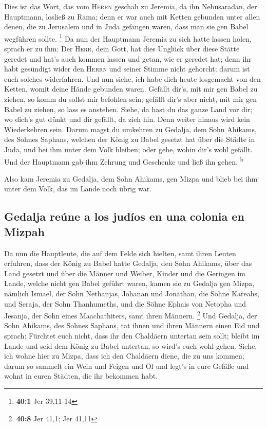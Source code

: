  Dies ist das Wort, das vom \textsc{Herrn} geschah zu
Jeremia, da ihn Nebusaradan, der Hauptmann, losließ zu Rama; denn er war
auch mit Ketten gebunden unter allen denen, die zu Jerusalem und in Juda
gefangen waren, dass man sie gen Babel wegführen sollte. \footnote{\textbf{40:1}
  Jer 39,11-14}  Da nun der Hauptmann Jeremia zu sich
hatte lassen holen, sprach er zu ihm: Der \textsc{Herr}, dein Gott, hat
dies Unglück über diese Stätte geredet  und hat's auch
kommen lassen und getan, wie er geredet hat; denn ihr habt gesündigt
wider den \textsc{Herrn} und seiner Stimme nicht gehorcht; darum ist
euch solches widerfahren.  Und nun siehe, ich habe dich
heute losgemacht von den Ketten, womit deine Hände gebunden waren.
Gefällt dir's, mit mir gen Babel zu ziehen, so komm du sollst mir
befohlen sein; gefällt dir's aber nicht, mit mir gen Babel zu ziehen, so
lass es anstehen. Siehe, da hast du das ganze Land vor dir; wo dich's
gut dünkt und dir gefällt, da zieh hin.  Denn weiter
hinaus wird kein Wiederkehren sein. Darum magst du umkehren zu Gedalja,
dem Sohn Ahikams, des Sohnes Saphans, welchen der König zu Babel gesetzt
hat über die Städte in Juda, und bei ihm unter dem Volk bleiben; oder
gehe, wohin dir's wohl gefällt. Und der Hauptmann gab ihm Zehrung und
Geschenke und ließ ihn gehen. \textsuperscript{b}

 Also kam Jeremia zu Gedalja, dem Sohn Ahikams, gen Mizpa
und blieb bei ihm unter dem Volk, das im Lande noch übrig war.

\hypertarget{gedalja-reuxfane-a-los-juduxedos-en-una-colonia-en-mizpah}{%
\subsection{Gedalja reúne a los judíos en una colonia en
Mizpah}\label{gedalja-reuxfane-a-los-juduxedos-en-una-colonia-en-mizpah}}

 Da nun die Hauptleute, die auf dem Felde sich hielten,
samt ihren Leuten erfuhren, dass der König zu Babel hatte Gedalja, den
Sohn Ahikams, über das Land gesetzt und über die Männer und Weiber,
Kinder und die Geringen im Lande, welche nicht gen Babel geführt waren,
 kamen sie zu Gedalja gen Mizpa, nämlich Ismael, der Sohn
Nethanjas, Johanan und Jonathan, die Söhne Kareahs, und Seraja, der Sohn
Thanhumeths, und die Söhne Ephais von Netopha und Jesanja, der Sohn
eines Maachathiters, samt ihren Männern. \footnote{\textbf{40:8} Jer
  41,1; Jer 41,11}  Und Gedalja, der Sohn Ahikams, des
Sohnes Saphans, tat ihnen und ihren Männern einen Eid und sprach:
Fürchtet euch nicht, dass ihr den Chaldäern untertan sein sollt; bleibt
im Lande und seid dem König zu Babel untertan, so wird's euch wohl
gehen.  Siehe, ich wohne hier zu Mizpa, dass ich den
Chaldäern diene, die zu uns kommen; darum so sammelt ein Wein und Feigen
und Öl und legt's in eure Gefäße und wohnt in euren Städten, die ihr
bekommen habt.


